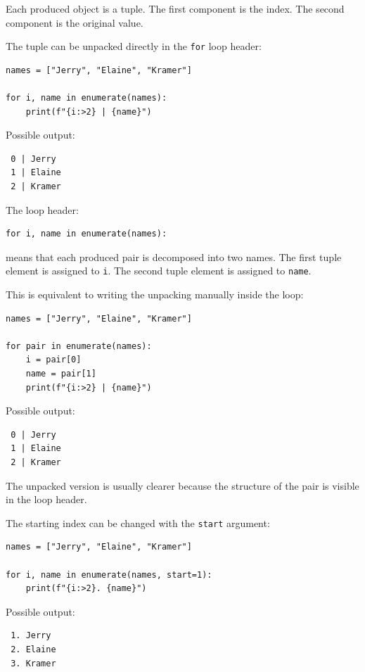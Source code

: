 Each produced object is a tuple. The first component is the index. The second component is the original value.

The tuple can be unpacked directly in the \texttt{for} loop header:

\begin{verbatim}
names = ["Jerry", "Elaine", "Kramer"]

for i, name in enumerate(names):
    print(f"{i:>2} | {name}")
\end{verbatim}

Possible output:

\begin{verbatim}
 0 | Jerry
 1 | Elaine
 2 | Kramer
\end{verbatim}

The loop header:

\begin{verbatim}
for i, name in enumerate(names):
\end{verbatim}

means that each produced pair is decomposed into two names. The first tuple element is assigned to \texttt{i}. The second tuple element is assigned to \texttt{name}.

This is equivalent to writing the unpacking manually inside the loop:

\begin{verbatim}
names = ["Jerry", "Elaine", "Kramer"]

for pair in enumerate(names):
    i = pair[0]
    name = pair[1]
    print(f"{i:>2} | {name}")
\end{verbatim}

Possible output:

\begin{verbatim}
 0 | Jerry
 1 | Elaine
 2 | Kramer
\end{verbatim}

The unpacked version is usually clearer because the structure of the pair is visible in the loop header.

The starting index can be changed with the \texttt{start} argument:

\begin{verbatim}
names = ["Jerry", "Elaine", "Kramer"]

for i, name in enumerate(names, start=1):
    print(f"{i:>2}. {name}")
\end{verbatim}

Possible output:

\begin{verbatim}
 1. Jerry
 2. Elaine
 3. Kramer
\end{verbatim}

